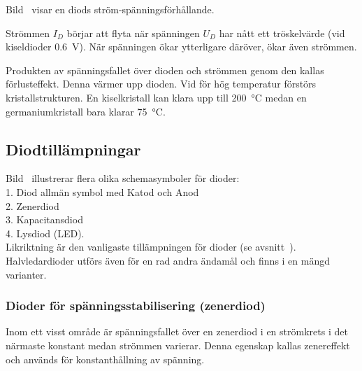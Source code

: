 Bild~ visar en diods ström-spänningsförhållande.

Strömmen \(I_D\) börjar att flyta när spänningen \(U_D\) har nått ett
tröskelvärde (vid kiseldioder \qty{0,6}{\volt}).
När spänningen ökar ytterligare däröver, ökar även strömmen.

Produkten av spänningsfallet över dioden och strömmen genom den kallas
förlusteffekt. Denna värmer upp dioden. Vid för hög temperatur förstörs
kristallstrukturen.
En kiselkristall kan klara upp till \qty{200}{\degreeCelsius} medan en
germaniumkristall bara klarar \qty{75}{\degreeCelsius}.\\


\newpage
\subsection{Diodtillämpningar}

Bild~ illustrerar flera olika schemasymboler för dioder:\\
1. Diod allmän symbol med Katod och Anod\\
2. Zenerdiod\\
3. Kapacitansdiod\\
4. Lysdiod (LED).\\

Likriktning är den vanligaste tillämpningen för dioder (se
avsnitt~).
Halvledardioder utförs även för en rad andra ändamål och finns i en mängd
varianter.

\subsubsection{Dioder för spänningsstabilisering (zenerdiod)}
\label{subsec:zenerdiod}

Inom ett visst område är spänningsfallet över en zenerdiod i en strömkrets i det
närmaste konstant medan strömmen varierar.
Denna egenskap kallas zenereffekt och används för konstanthållning av spänning.

